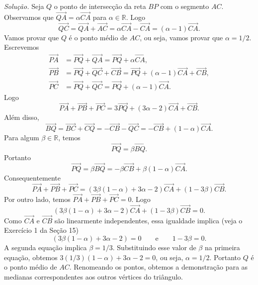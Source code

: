 \documentclass[a4paper,11pt]{article}
\newcommand{\R}{\mathbb{R}}
\begin{document}
\emph{Solução.}
Seja $Q$ o ponto de intersecção da reta $BP$ com o segmento $AC$.
Observamos que $\overrightarrow{QA} = \alpha \overrightarrow{CA}$ para $\alpha \in \R$.
Logo
\[
  \overrightarrow{QC} = \overrightarrow{QA} + \overrightarrow{AC} = \alpha \overrightarrow{CA} - \overrightarrow{CA} = (\alpha - 1) \overrightarrow{CA}.
\]
Vamos provar que $Q$ é o ponto médio de $AC$, ou seja, vamos provar que $\alpha = 1/2$.
Escrevemos
\begin{align*}
  \overrightarrow{PA} & = \overrightarrow{PQ} + \overrightarrow{QA} = \overrightarrow{PQ} + \alpha \overrightarrow{CA}, \\
  \overrightarrow{PB} & = \overrightarrow{PQ} + \overrightarrow{QC} + \overrightarrow{CB} = \overrightarrow{PQ} + (\alpha - 1) \overrightarrow{CA} + \overrightarrow{CB}, \\
  \overrightarrow{PC} & = \overrightarrow{PQ} + \overrightarrow{QC} = \overrightarrow{PQ} + (\alpha - 1) \overrightarrow{CA}.
\end{align*}
Logo
\[
  \overrightarrow{PA} + \overrightarrow{PB} + \overrightarrow{PC} = 3 \overrightarrow{PQ} + (3\alpha - 2) \overrightarrow{CA} + \overrightarrow{CB}.
\]
Além disso,
\[
  \overrightarrow{BQ} = \overrightarrow{BC} + \overrightarrow{CQ} = - \overrightarrow{CB} - \overrightarrow{QC} = - \overrightarrow{CB} + (1 - \alpha) \overrightarrow{CA}.
\]
Para algum $\beta \in \R$, temos
\[
  \overrightarrow{PQ} = \beta \overrightarrow{BQ}.
\]
Portanto
\[
  \overrightarrow{PQ} = \beta \overrightarrow{BQ} = - \beta \overrightarrow{CB} + \beta (1 - \alpha) \overrightarrow{CA}.
\]
Consequentemente
\[
  \overrightarrow{PA} + \overrightarrow{PB} + \overrightarrow{PC} = (3 \beta (1 - \alpha) + 3\alpha - 2) \overrightarrow{CA} + (1 - 3 \beta) \overrightarrow{CB}.
\]
Por outro lado, temos $\overrightarrow{PA} + \overrightarrow{PB} + \overrightarrow{PC} = 0$.
Logo
\[
  (3 \beta (1 - \alpha) + 3\alpha - 2) \overrightarrow{CA} + (1 - 3 \beta) \overrightarrow{CB} = 0.
\]
Como $\overrightarrow{CA}$ e $\overrightarrow{CB}$ são linearmente independentes, essa igualdade implica
(veja o Exercício 1 da Seção 15)
\[
  (3 \beta(1 - \alpha) + 3\alpha - 2) = 0 \qquad \text{e} \qquad 1 - 3 \beta = 0.
\]
A segunda equação implica $\beta = 1/3$.
Substituindo esse valor de $\beta$ na primeira equação, obtemos $3(1/3)(1 - \alpha) + 3\alpha - 2 = 0$, ou seja, $\alpha = 1/2$.
Portanto $Q$ é o ponto médio de $AC$.
Renomeando os pontos, obtemos a demonstração para as medianas correspondentes aos outros vértices do triângulo.

\vspace{\baselineskip}
\end{document}
